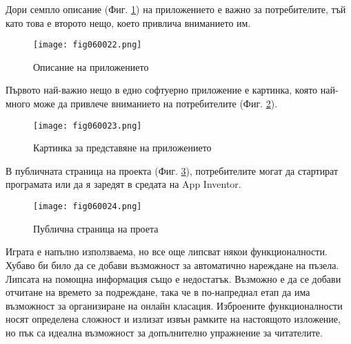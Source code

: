 Дори семпло описание (Фиг. \ref{fig060022}) на приложението е важно за потребителите, тъй като това е второто нещо, което привлича вниманието им.

\begin{figure}[H]
  \centering
  \texttt{[image: fig060022.png]}
  \caption{Описание на приложението}
\label{fig060022}
\end{figure}

Първото най-важно нещо в едно софтуерно приложение е картинка, която най-много може да привлече вниманието на потребителите (Фиг. \ref{fig060023}).

\begin{figure}[H]
  \centering
  \texttt{[image: fig060023.png]}
  \caption{Картинка за представяне на приложението}
\label{fig060023}
\end{figure}

В публичната страница на проекта (Фиг. \ref{fig060024}), потребителите могат да стартират програмата или да я заредят в средата на App Inventor.

\begin{figure}[H]
  \centering
  \texttt{[image: fig060024.png]}
  \caption{Публична страница на проета}
\label{fig060024}
\end{figure}

Играта е напълно използваема, но все още липсват някои функционалности. Хубаво би било да се добави възможност за автоматично нареждане на пъзела. Липсата на помощна информация също е недостатък. Възможно е да се добави отчитане на времето за подреждане, така че в по-напреднал етап да има възможност за организиране на онлайн класация. Изброените функционалности носят определена сложност и излизат извън рамките на настоящото изложение, но пък са идеална възможност за допълнително упражнение за читателите. 

